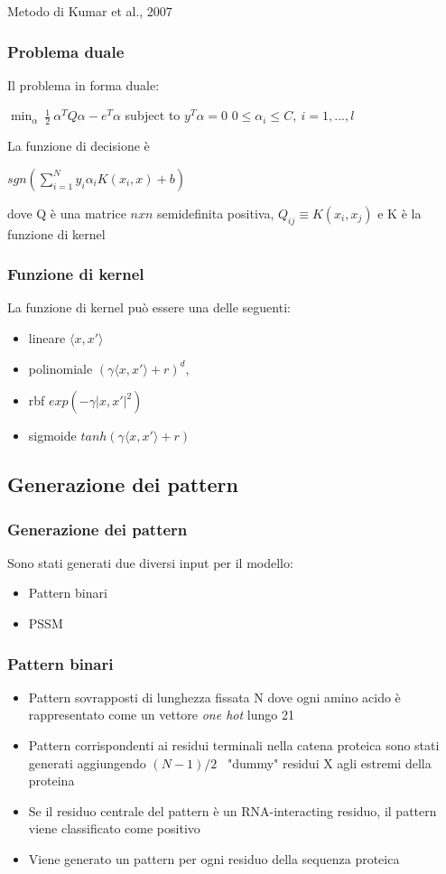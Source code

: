 \documentclass{beamer}
\begin{document}
\begin{section}{Metodo di Kumar et al., 2007}
\begin{frame}
\frametitle{Problema duale}
Il problema in forma duale:
\begin{center}
$\displaystyle\min_{\alpha} \ \frac{1}{2} \ \alpha^{T}Q\alpha - e^{T} \alpha $\newline
subject to $y^{T} \alpha = 0 $ \newline
$ 0 \le \alpha_{i} \le C, \ i = 1,...,l$
\end{center}
La funzione di decisione \`{e} 
\begin{center}
$ sgn( \sum_{i=1}^{N}y_{i}\alpha_{i}K(x_{i},x) + b)$
\end{center}
dove Q  \`{e} una matrice $nxn $ semidefinita positiva, $Q_{ij} \equiv K(x_{i}, x_{j})$ e K \`{e}  la funzione di kernel
\end{frame}

\begin{frame}
\frametitle{Funzione di kernel}
La funzione di kernel pu\`{o} essere una delle seguenti:\newline
\begin{itemize}
\item lineare $ \langle x, x'\rangle $
\item polinomiale $ (\gamma\langle x, x'\rangle + r)^{d} $,
\item rbf $ exp( -\gamma |x, x'|^{2}) $
\item sigmoide $ tanh(\gamma\langle x, x'\rangle + r) $
\end{itemize}
\end{frame}

\subsection{Generazione dei pattern}
\begin{frame}
\frametitle{Generazione dei pattern}
Sono stati generati due diversi input per il modello:
\begin{itemize}
\item Pattern binari
\item PSSM
\end{itemize}
\end{frame}

\begin{frame}
\frametitle{Pattern binari}
\begin{itemize}
\item Pattern sovrapposti di lunghezza fissata N dove ogni amino acido \`{e} rappresentato come un vettore \textit{one hot} lungo 21
\item Pattern corrispondenti ai residui terminali nella catena proteica sono stati generati aggiungendo $(N-1)/2$ \ "dummy" residui X agli estremi della proteina
\item Se il residuo centrale del pattern \`{e} un RNA-interacting residuo, il pattern viene classificato come positivo
\item Viene generato un pattern per ogni residuo della sequenza proteica
\end{itemize}
\end{frame}


\end{section}
\end{document}
